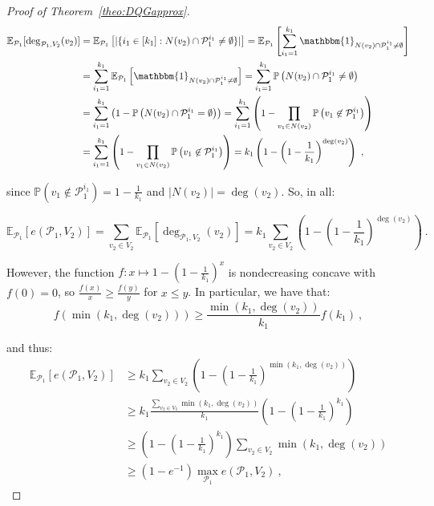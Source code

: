\begin{proof}[Proof of Theorem~\ref{theo:DQGapprox}]
\begin{equation}
  \begin{aligned}
    \mathbb{E}_{\mathcal{P}_1}[\deg_{\mathcal{P}_1,V_2}(v_2)] &= \mathbb{E}_{\mathcal{P}_1}\left[|\{i_1 \in [k_1]: N(v_2) \cap \mathcal{P}_1^{i_1} \not= \emptyset  \}|\right]
    = \mathbb{E}_{\mathcal{P}_1}\left[\sum_{i_1=1}^{k_1} \mathbbm{1}_{N(v_2) \cap \mathcal{P}_1^{i_1} \not= \emptyset}\right]\\
    &= \sum_{i_1=1}^{k_1} \mathbb{E}_{\mathcal{P}_1}\left[\mathbbm{1}_{N(v_2) \cap \mathcal{P}_1^{i_1} \not= \emptyset}\right]
    = \sum_{i_1=1}^{k_1}\mathbb{P}\left(N(v_2) \cap \mathcal{P}_1^{i_1} \not= \emptyset\right)\\
    &= \sum_{i_1=1}^{k_1}\left(1 - \mathbb{P}\left(N(v_2) \cap \mathcal{P}_1^{i_1} = \emptyset\right)\right)
    = \sum_{i_1=1}^{k_1}\left(1 - \prod_{v_1 \in N(v_2)}\mathbb{P}\left(v_1 \not\in \mathcal{P}_1^{i_1}\right)\right)\\
    &= \sum_{i_1=1}^{k_1}\left(1 - \prod_{v_1 \in N(v_2)}\mathbb{P}\left(v_1 \not\in \mathcal{P}_1^{i_1}\right)\right) = k_1\left(1-\left(1-\frac{1}{k_1}\right)^{\deg(v_2)}\right) \ ,
  \end{aligned}
\end{equation}

since $\mathbb{P}\left(v_1 \not\in \mathcal{P}_1^{i_1}\right)=1-\frac{1}{k_1}$ and $|N(v_2)|=\deg(v_2)$. So, in all:

\[ \mathbb{E}_{\mathcal{P}_1}[e(\mathcal{P}_1,V_2)] = \sum_{v_2 \in V_2}\mathbb{E}_{\mathcal{P}_1}[\deg_{\mathcal{P}_1,V_2}(v_2)] = k_1\sum_{v_2 \in V_2}\left(1-\left(1-\frac{1}{k_1}\right)^{\deg(v_2)}\right) \ . \]

However, the function $f : x \mapsto 1-\left(1-\frac{1}{k_1}\right)^x$ is nondecreasing concave with $f(0)=0$, so $\frac{f(x)}{x} \geq \frac{f(y)}{y}$ for $x \leq y$. In particular, we have that:
\[ f(\min(k_1,\deg(v_2))) \geq \frac{\min(k_1,\deg(v_2))}{k_1}f(k_1) \ , \]

and thus:
\begin{equation}
  \begin{aligned}
    \mathbb{E}_{\mathcal{P}_1}[e(\mathcal{P}_1,V_2)] &\geq k_1\sum_{v_2 \in V_2}\left(1-\left(1-\frac{1}{k_1}\right)^{\min(k_1,\deg(v_2))}\right)\\
    &\geq k_1\frac{\sum_{v_2 \in V_2}\min(k_1,\deg(v_2))}{k_1}\left(1-\left(1-\frac{1}{k_1}\right)^{k_1}\right)\\
    &\geq \left(1-\left(1-\frac{1}{k_1}\right)^{k_1}\right)\sum_{v_2 \in V_2}\min\left(k_1,\deg(v_2)\right)\\
    &\geq (1-e^{-1})\max_{\mathcal{P}_1}e(\mathcal{P}_1,V_2) \ ,
  \end{aligned}
\end{equation}



\end{proof}
